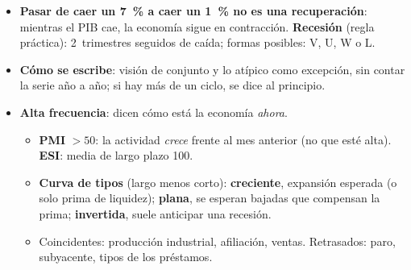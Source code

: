 \documentclass{article}
\begin{document}
\begin{columnas}
\begin{itemize}[itemsep=1.5pt]
\item \textbf{Pasar de caer un 7~\% a caer un 1~\% no es una recuperación}: mientras el PIB cae, la economía sigue en contracción. \textbf{Recesión} (regla práctica): 2~trimestres seguidos de caída; formas posibles: V, U, W o L.
\item \textbf{Cómo se escribe}: visión de conjunto y lo atípico como excepción, sin contar la serie año a año; si hay más de un ciclo, se dice al principio.
\item \textbf{Alta frecuencia}: dicen cómo está la economía \emph{ahora}.
  \begin{itemize}
  \item \textbf{PMI} $>50$: la actividad \emph{crece} frente al mes anterior (no que esté alta). \textbf{ESI}: media de largo plazo 100.
  \item \textbf{Curva de tipos} (largo menos corto): \textbf{creciente}, expansión esperada (o solo prima de liquidez); \textbf{plana}, se esperan bajadas que compensan la prima; \textbf{invertida}, suele anticipar una recesión.
  \item Coincidentes: producción industrial, afiliación, ventas. Retrasados: paro, subyacente, tipos de los préstamos.
  \end{itemize}
\end{itemize}


\end{columnas}
\end{document}
